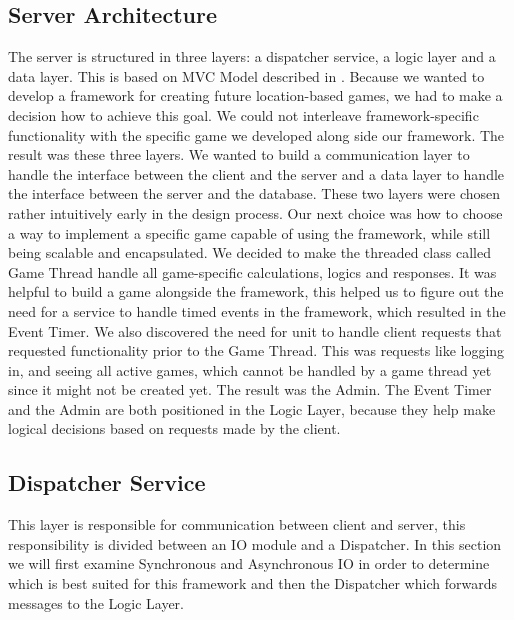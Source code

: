 \subsection{Server Architecture}
\label{sec:server}

The server is structured in three layers: a dispatcher service, a logic layer and a data layer. This is based on MVC Model described in . Because we wanted to develop a framework for creating future location-based games, we had to make a decision how to achieve this goal. We could not interleave framework-specific functionality with the specific game we developed along side our framework. The result was these three layers. We wanted to build a communication layer to handle the interface between the client and the server and a data layer to handle the interface between the server and the database. These two layers were chosen rather intuitively early in the design process. Our next choice was how to choose a way to implement a specific game capable of using the framework, while still being scalable and encapsulated. We decided to make the threaded class called Game Thread handle all game-specific calculations, logics and responses. 
It was helpful to build a game alongside the framework, this helped us to figure out the need for a service to handle timed events in the framework, which resulted in the Event Timer. We also discovered the need for unit to handle client requests that requested functionality prior to the Game Thread. This was requests like logging in, and seeing all active games, which cannot be handled by a game thread yet since it might not be created yet. The result was the Admin. The Event Timer and the Admin are both positioned in the Logic Layer, because they help make logical decisions based on requests made by the client. 



\subsection{Dispatcher Service}
This layer is responsible for communication between client and server, this responsibility is divided between an IO module and a Dispatcher. In this section we will first examine Synchronous and Asynchronous IO in order to determine which is best suited for this framework and then the Dispatcher which forwards messages to the Logic Layer. 

